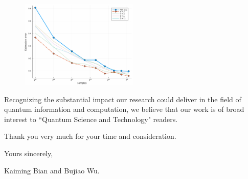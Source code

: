 \documentclass[a4paper, 12pt]{article}
\begin{document}
\begin{multicols}{2}
\columnbreak
\begin{figure}[H]
\includegraphics[width = 0.5\textwidth]{error_H.pdf}
\label{fig:Majorana}
\end{figure}
\end{multicols}

\noindent Recognizing the substantial impact our research could deliver in the field of quantum information and computation, we believe that our work is of broad interest to ``Quantum Science and Technology" readers.

\vspace{8pt}
\noindent Thank you very much for your time and consideration.

\vspace{8pt}
\noindent  Yours sincerely, 

\noindent Kaiming Bian and Bujiao Wu.
\end{document}
